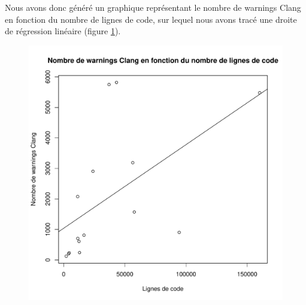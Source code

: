Nous avons donc généré un graphique représentant le nombre de warnings
Clang en fonction du nombre de lignes de code, sur lequel nous avons
tracé une droite de régression linéaire (figure \ref{fig:clang_lin}).

\begin{figure}[h]
  \centering
  \includegraphics[width=.48\textwidth]{figures/clang_lin.pdf}
  \caption{}\label{fig:clang_lin}
\end{figure}
